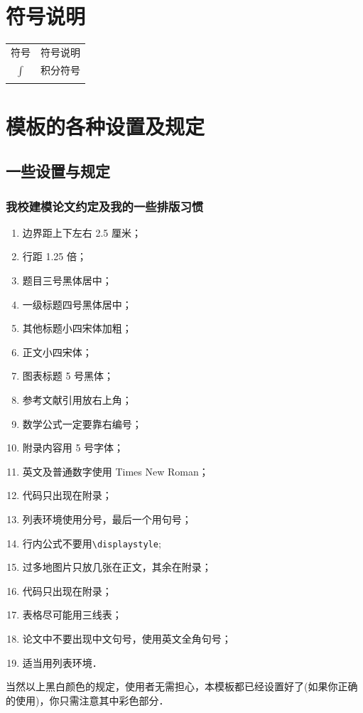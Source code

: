 \documentclass{JXUSTmodeling}
\begin{document}
    \section{符号说明}\label{sec:3}
    \begin{center}
        \begin{tabularx}{0.5\textwidth}{c@{\hspace{1pc}}|@{\hspace{1pc}}X}
            \Xhline{0.08em}
            符号 & \multicolumn{1}{c}{符号说明}\\
            \Xhline{0.05em}
            $\int$ & 积分符号\\
            \Xhline{0.08em}
        \end{tabularx}
    \end{center}

    \section{模板的各种设置及规定}\label{sec:4}
    \subsection{一些设置与规定}\label{sub:4.1}
    \subsubsection{我校建模论文约定及我的一些排版习惯}
    \begin{enumerate}
    \item 边界距上下左右 2.5 厘米；
    \item 行距 1.25 倍；
    \item 题目三号黑体居中；
    \item 一级标题四号黑体居中；
    \item 其他标题小四宋体加粗；
    \item 正文小四宋体；
    \item 图表标题 5 号黑体；
    \item 参考文献引用放右上角；
    \item 数学公式一定要靠右编号；
    \item 附录内容用 5 号字体；
    \item 英文及普通数字使用 Times New Roman；
    \item {\color{red} 代码只出现在附录}；
    \item {\color{red} 列表环境使用分号，最后一个用句号}；
    \item {\color{red} 行内公式不要用\verb|\displaystyle|};
    \item {\color{red} 过多地图片只放几张在正文，其余在附录}；
    \item {\color{red} 代码只出现在附录}；
    \item {\color{red} 表格尽可能用三线表}；
    \item {\color{red} 论文中不要出现中文句号，使用英文全角句号}；
    \item {\color{red} 适当用列表环境}．
   \end{enumerate}
   当然以上黑白颜色的规定，使用者无需担心，本模板都已经设置好了(如果你正确的使用)，你只需注意其中彩色部分．
\end{document}
